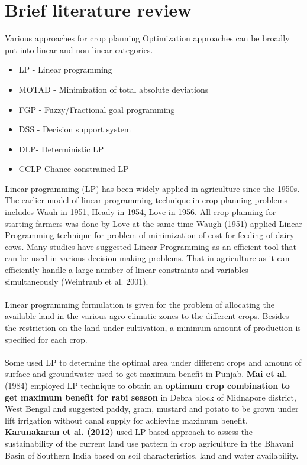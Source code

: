 \documentclass[conference]{IEEEtran}
\begin{document}
\section{Brief literature review}
Various approaches for crop planning Optimization approaches can be broadly put into linear and non-linear categories. 
\newline
\begin{itemize}
    \item LP - Linear programming 
    \item MOTAD - Minimization of total absolute deviations
    \item FGP - Fuzzy/Fractional goal programming
    \item DSS - Decision support system
    \item DLP- Deterministic LP
    \item CCLP-Chance constrained LP
\end{itemize}
Linear programming (LP) has been widely applied in agriculture since the 1950s. The earlier model of linear programming technique in crop planning problems includes Wauh in 1951, Heady in 1954, Love in 1956. All crop planning for starting farmers was done by Love at the same time Waugh (1951) applied Linear Programming technique for problem of minimization of cost for feeding of dairy cows. Many studies have suggested Linear Programming as an efficient tool that can be used in various decision-making problems. That in agriculture as it can efficiently handle a large number of linear constraints and variables simultaneously (Weintraub et al. 2001).
\\\\
Linear programming formulation is given for the problem of allocating the available land in the various agro climatic zones to the different crops. Besides the restriction on the land under cultivation, a minimum amount of production is specified for each crop.
\\\\
Some used LP to determine the optimal area under different crops and amount of surface and groundwater used to get maximum benefit in Punjab. \textbf{Mai et al.} (1984) employed LP technique to obtain an \textbf{optimum crop combination to get maximum benefit for rabi season} in Debra block of Midnapore district, West Bengal and suggested paddy, gram, mustard and potato to be grown under lift irrigation without canal supply for achieving maximum benefit. \textbf{Karunakaran et al. (2012)} used LP based approach to assess the sustainability of the current land use pattern in crop agriculture in the Bhavani Basin of Southern India based on soil characteristics, land and water availability. 
\end{document}
